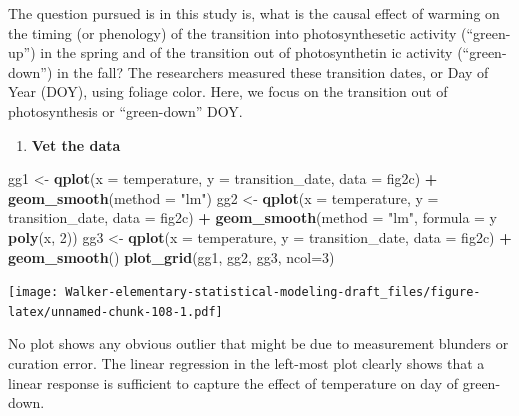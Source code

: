 \documentclass[]{book}
\newenvironment{Shaded}{\begin{snugshade}}{\end{snugshade}}
\newcommand{\DataTypeTok}[1]{\textcolor[rgb]{0.13,0.29,0.53}{#1}}
\newcommand{\DecValTok}[1]{\textcolor[rgb]{0.00,0.00,0.81}{#1}}
\newcommand{\KeywordTok}[1]{\textcolor[rgb]{0.13,0.29,0.53}{\textbf{#1}}}
\newcommand{\NormalTok}[1]{#1}
\newcommand{\OperatorTok}[1]{\textcolor[rgb]{0.81,0.36,0.00}{\textbf{#1}}}
\newcommand{\StringTok}[1]{\textcolor[rgb]{0.31,0.60,0.02}{#1}}
\providecommand{\tightlist}{%
  \setlength{\itemsep}{0pt}\setlength{\parskip}{0pt}}
\begin{document}
The question pursued is in this study is, what is the causal effect of warming on the timing (or phenology) of the transition into photosynthesetic activity (``green-up'') in the spring and of the transition out of photosynthetin ic activity (``green-down'') in the fall? The researchers measured these transition dates, or Day of Year (DOY), using foliage color. Here, we focus on the transition out of photosynthesis or ``green-down'' DOY.

\begin{enumerate}
\def\labelenumi{\arabic{enumi}.}
\tightlist
\item
  \textbf{Vet the data}
\end{enumerate}

\begin{Shaded}
\begin{Highlighting}[]
\NormalTok{gg1 <-}\StringTok{ }\KeywordTok{qplot}\NormalTok{(}\DataTypeTok{x =}\NormalTok{ temperature,}
      \DataTypeTok{y =}\NormalTok{ transition_date,}
      \DataTypeTok{data =}\NormalTok{ fig2c) }\OperatorTok{+}
\StringTok{  }\KeywordTok{geom_smooth}\NormalTok{(}\DataTypeTok{method =} \StringTok{"lm"}\NormalTok{)}
\NormalTok{gg2 <-}\StringTok{ }\KeywordTok{qplot}\NormalTok{(}\DataTypeTok{x =}\NormalTok{ temperature,}
      \DataTypeTok{y =}\NormalTok{ transition_date,}
      \DataTypeTok{data =}\NormalTok{ fig2c) }\OperatorTok{+}
\StringTok{  }\KeywordTok{geom_smooth}\NormalTok{(}\DataTypeTok{method =} \StringTok{"lm"}\NormalTok{, }\DataTypeTok{formula =}\NormalTok{ y }\OperatorTok{~}\StringTok{ }\KeywordTok{poly}\NormalTok{(x, }\DecValTok{2}\NormalTok{))}
\NormalTok{gg3 <-}\StringTok{ }\KeywordTok{qplot}\NormalTok{(}\DataTypeTok{x =}\NormalTok{ temperature,}
      \DataTypeTok{y =}\NormalTok{ transition_date,}
      \DataTypeTok{data =}\NormalTok{ fig2c) }\OperatorTok{+}
\StringTok{  }\KeywordTok{geom_smooth}\NormalTok{()}
\KeywordTok{plot_grid}\NormalTok{(gg1, gg2, gg3, }\DataTypeTok{ncol=}\DecValTok{3}\NormalTok{)}
\end{Highlighting}
\end{Shaded}

\texttt{[image: Walker-elementary-statistical-modeling-draft\_files/figure-latex/unnamed-chunk-108-1.pdf]}

No plot shows any obvious outlier that might be due to measurement blunders or curation error. The linear regression in the left-most plot clearly shows that a linear response is sufficient to capture the effect of temperature on day of green-down.
\end{document}
